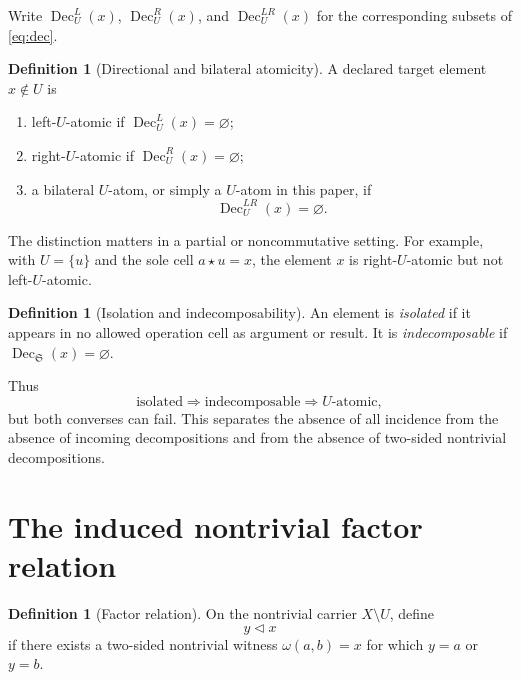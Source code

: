 \documentclass[11pt]{article}
\theoremstyle{definition}
\newtheorem{definition}[theorem]{Definition}
\theoremstyle{remark}
\newcommand{\Sbx}{\mathfrak S}
\newcommand{\Dec}{\operatorname{Dec}}
\begin{document}
Write \(\Dec_U^L(x)\), \(\Dec_U^R(x)\), and \(\Dec_U^{LR}(x)\) for the corresponding subsets of \eqref{eq:dec}.

\begin{definition}[Directional and bilateral atomicity]
A declared target element \(x\notin U\) is
\begin{enumerate}[label=(\roman*)]
\item left-\(U\)-atomic if \(\Dec_U^L(x)=\varnothing\);
\item right-\(U\)-atomic if \(\Dec_U^R(x)=\varnothing\);
\item a bilateral \(U\)-atom, or simply a \(U\)-atom in this paper, if
\begin{equation}
\Dec_U^{LR}(x)=\varnothing.
\label{eq:atomdef}
\end{equation}
\end{enumerate}
\end{definition}

The distinction matters in a partial or noncommutative setting. For example, with \(U=\{u\}\) and the sole cell \(a\star u=x\), the element \(x\) is right-\(U\)-atomic but not left-\(U\)-atomic.

\begin{definition}[Isolation and indecomposability]
An element is \emph{isolated} if it appears in no allowed operation cell as argument or result. It is \emph{indecomposable} if \(\Dec_{\Sbx}(x)=\varnothing\).
\end{definition}

Thus
\[
\text{isolated}\Longrightarrow\text{indecomposable}\Longrightarrow U\text{-atomic},
\]
but both converses can fail. This separates the absence of all incidence from the absence of incoming decompositions and from the absence of two-sided nontrivial decompositions.

\section{The induced nontrivial factor relation}

\begin{definition}[Factor relation]
On the nontrivial carrier \(X\setminus U\), define
\begin{equation}
y\triangleleft x
\label{eq:factorrel}
\end{equation}
if there exists a two-sided nontrivial witness \(\omega(a,b)=x\) for which \(y=a\) or \(y=b\).
\end{definition}
\end{document}
